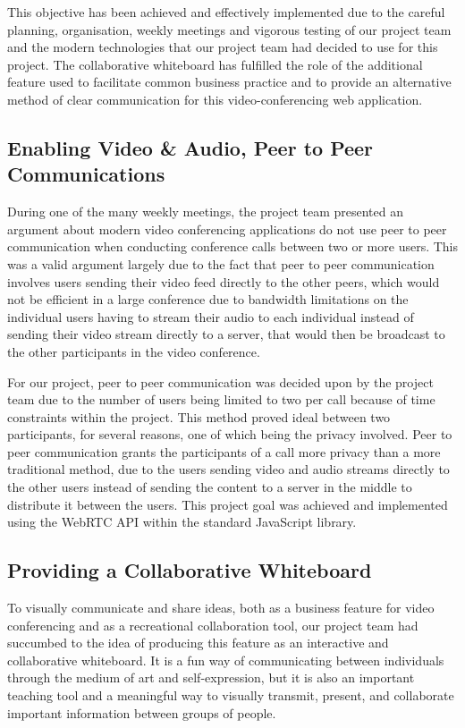 This objective has been achieved and effectively implemented due to the careful planning, organisation, weekly meetings and vigorous testing of our project team and the modern technologies that our project team had decided to use for this project. The collaborative whiteboard has fulfilled the role of the additional feature used to facilitate common business practice and to provide an alternative method of clear communication for this video-conferencing web application.
\subsection{Enabling Video \& Audio, Peer to Peer Communications}
During one of the many weekly meetings, the project team presented an argument about modern video conferencing applications do not use peer to peer communication when conducting conference calls between two or more users. This was a valid argument largely due to the fact that peer to peer communication involves users sending their video feed directly to the other peers, which would not be efficient in a large conference due to bandwidth limitations on the individual users having to stream their audio to each individual instead of sending their video stream directly to a server, that would then be broadcast to the other participants in the video conference. 

For our project, peer to peer communication was decided upon by the project team due to the number of users being limited to two per call because of time constraints within the project. This method proved ideal between two participants, for several reasons, one of which being the privacy involved. Peer to peer communication grants the participants of a call more privacy than a more traditional method, due to the users sending video and audio streams directly to the other users instead of sending the content to a server in the middle to distribute it between the users. This project goal was achieved and implemented using the WebRTC API within the standard JavaScript library.
\subsection{Providing a Collaborative Whiteboard}
To visually communicate and share ideas, both as a business feature for video conferencing and as a recreational collaboration tool, our project team had succumbed to the idea of producing this feature as an interactive and collaborative whiteboard. It is a fun way of communicating between individuals through the medium of art and self-expression, but it is also an important teaching tool and a meaningful way to visually transmit, present, and collaborate important information between groups of people. 

